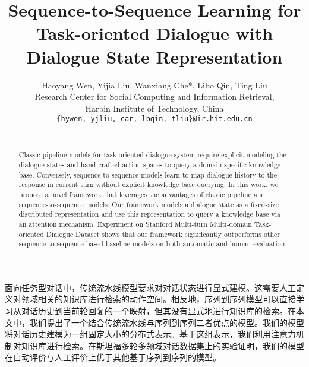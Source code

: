 \documentclass[11pt]{article}
\title{Sequence-to-Sequence Learning for Task-oriented Dialogue with Dialogue State Representation}
\author{Haoyang Wen, Yijia Liu, Wanxiang Che*, Libo Qin, Ting Liu\\
	Research Center for Social Computing and Information Retrieval, \\
	Harbin Institute of Technology, China \\
	{\tt \{hywen, yjliu, car, lbqin, tliu\}@ir.hit.edu.cn} \\\
}
\date{}
\begin{document}
\maketitle
\begin{abstract}
	Classic pipeline models for task-oriented dialogue system require explicit modeling the dialogue states and
hand-crafted action spaces to query a domain-specific knowledge base.
Conversely, sequence-to-sequence models learn to map dialogue history to the response in current turn
without explicit knowledge base querying. In this work, we
propose a novel framework that leverages the advantages of classic pipeline and
sequence-to-sequence models. Our framework models a dialogue state as a fixed-size distributed
representation and use this representation to query a knowledge base via an attention mechanism.
Experiment on Stanford Multi-turn Multi-domain
Task-oriented Dialogue Dataset shows that our framework significantly outperforms other
sequence-to-sequence based baseline models on both automatic and human evaluation.
\end{abstract}
\makesltitle
\begin{slabstract}
	\begin{CJK}{UTF8}{gbsn}
		面向任务型对话中，传统流水线模型要求对对话状态进行显式建模。这需要人工定义对领域相关的知识库进行检索的动作空间。相反地，序列到序列模型可以直接学习从对话历史到当前轮回复的一个映射，但其没有显式地进行知识库的检索。在本文中，我们提出了一个结合传统流水线与序列到序列二者优点的模型。我们的模型将对话历史建模为一组固定大小的分布式表示。基于这组表示，我们利用注意力机制对知识库进行检索。在斯坦福多轮多领域对话数据集上的实验证明，我们的模型在自动评价与人工评价上优于其他基于序列到序列的模型。
	\end{CJK}
\end{slabstract}
\end{document}
